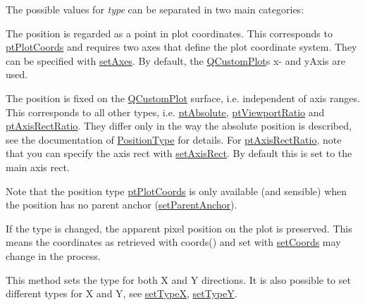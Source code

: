The possible values for {\itshape type} can be separated in two main categories\+:

\begin{DoxyItemize}
\item The position is regarded as a point in plot coordinates. This corresponds to \hyperlink{classQCPItemPosition_aad9936c22bf43e3d358552f6e86dbdc8ad5ffb8dc99ad73263f7010c77342294c}{pt\+Plot\+Coords} and requires two axes that define the plot coordinate system. They can be specified with \hyperlink{classQCPItemPosition_a2185f45c75ac8cb9be89daeaaad50e37}{set\+Axes}. By default, the \hyperlink{classQCustomPlot}{Q\+Custom\+Plot}\textquotesingle{}s x-\/ and y\+Axis are used.\end{DoxyItemize}
\begin{DoxyItemize}
\item The position is fixed on the \hyperlink{classQCustomPlot}{Q\+Custom\+Plot} surface, i.\+e. independent of axis ranges. This corresponds to all other types, i.\+e. \hyperlink{classQCPItemPosition_aad9936c22bf43e3d358552f6e86dbdc8a564f5e53e550ead1ec5fc7fc7d0b73e0}{pt\+Absolute}, \hyperlink{classQCPItemPosition_aad9936c22bf43e3d358552f6e86dbdc8ac7d6aa89ceacb39658b0d6da061c789a}{pt\+Viewport\+Ratio} and \hyperlink{classQCPItemPosition_aad9936c22bf43e3d358552f6e86dbdc8a01080fd00eaf09fa238ef6b73bbfef75}{pt\+Axis\+Rect\+Ratio}. They differ only in the way the absolute position is described, see the documentation of \hyperlink{classQCPItemPosition_aad9936c22bf43e3d358552f6e86dbdc8}{Position\+Type} for details. For \hyperlink{classQCPItemPosition_aad9936c22bf43e3d358552f6e86dbdc8a01080fd00eaf09fa238ef6b73bbfef75}{pt\+Axis\+Rect\+Ratio}, note that you can specify the axis rect with \hyperlink{classQCPItemPosition_a0cd9b326fb324710169e92e8ca0041c2}{set\+Axis\+Rect}. By default this is set to the main axis rect.\end{DoxyItemize}
Note that the position type \hyperlink{classQCPItemPosition_aad9936c22bf43e3d358552f6e86dbdc8ad5ffb8dc99ad73263f7010c77342294c}{pt\+Plot\+Coords} is only available (and sensible) when the position has no parent anchor (\hyperlink{classQCPItemPosition_ac094d67a95d2dceafa0d50b9db3a7e51}{set\+Parent\+Anchor}).

If the type is changed, the apparent pixel position on the plot is preserved. This means the coordinates as retrieved with coords() and set with \hyperlink{classQCPItemPosition_aa988ba4e87ab684c9021017dcaba945f}{set\+Coords} may change in the process.

This method sets the type for both X and Y directions. It is also possible to set different types for X and Y, see \hyperlink{classQCPItemPosition_a2113b2351d6d00457fb3559a4e20c3ea}{set\+TypeX}, \hyperlink{classQCPItemPosition_ac2a454aa5a54c1615c50686601ec4510}{set\+TypeY}. 
